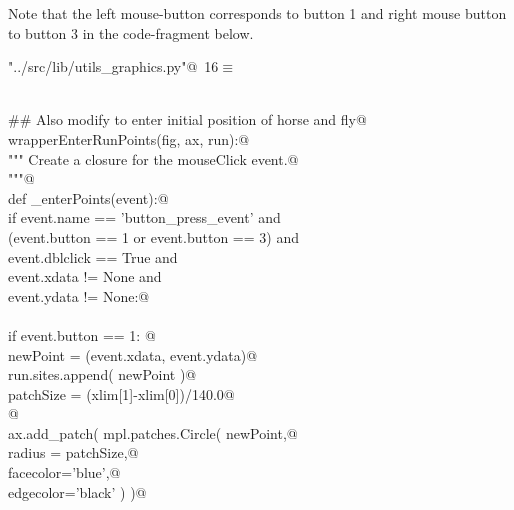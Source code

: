 \documentclass[11.5pt]{report}
\begin{document}
Note that the left mouse-button corresponds to button 1 and right mouse button
to button 3 in the code-fragment below. 

\begin{flushleft} \small\label{scrap5}\raggedright\small
{} \verb@"../src/lib/utils_graphics.py"@\nobreak\ {\footnotesize {16}}$\equiv$
\vspace{-1ex}
\begin{list}{}{} \item
\mbox{}\verb@@\\
\mbox{}\verb@## Also modify to enter initial position of horse and fly@\\
\mbox{}\verb@def wrapperEnterRunPoints(fig, ax, run):@\\
\mbox{}\verb@    """ Create a closure for the mouseClick event.@\\
\mbox{}\verb@    """@\\
\mbox{}\verb@    def _enterPoints(event):@\\
\mbox{}\verb@        if event.name     == 'button_press_event'      and \@\\
\mbox{}\verb@           (event.button   == 1 or event.button == 3)  and \@\\
\mbox{}\verb@           event.dblclick == True                      and \@\\
\mbox{}\verb@           event.xdata    != None                      and \@\\
\mbox{}\verb@           event.ydata    != None:@\\
\mbox{}\verb@@\\
\mbox{}\verb@             if event.button == 1:        @\\
\mbox{}\verb@               newPoint = (event.xdata, event.ydata)@\\
\mbox{}\verb@               run.sites.append( newPoint  )@\\
\mbox{}\verb@               patchSize  = (xlim[1]-xlim[0])/140.0@\\
\mbox{}\verb@   @\\
\mbox{}\verb@               ax.add_patch( mpl.patches.Circle( newPoint,@\\
\mbox{}\verb@                                              radius = patchSize,@\\
\mbox{}\verb@                                              facecolor='blue',@\\
\mbox{}\verb@                                              edgecolor='black'   )  )@\\

\end{list}
\end{flushleft}
\end{document}
